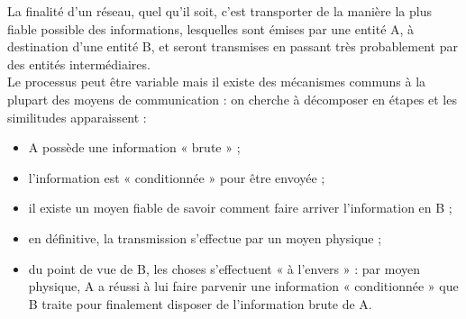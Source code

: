 La finalité d'un réseau, quel qu'il soit, c'est transporter de la manière la plus fiable possible des informations, lesquelles sont émises par une entité A, à destination d'une entité B, et seront transmises en passant très probablement par des entités intermédiaires.\\
Le processus peut être variable mais il existe des mécanismes communs à la plupart des moyens de communication : on cherche à décomposer en étapes et les similitudes apparaissent :
\begin{itemize}
    \item 	A possède une information « brute » ;
    \item 	l'information est « conditionnée » pour être envoyée ;
    \item 	il existe un moyen fiable de savoir comment faire arriver l'information en B ;
    \item 	en définitive, la transmission s'effectue par un moyen physique ;
    \item 	du point de vue de B, les choses s'effectuent « à l'envers » : par moyen physique, A a réussi à lui faire parvenir une information « conditionnée » que B traite pour finalement disposer de l'information brute de A.
\end{itemize}

